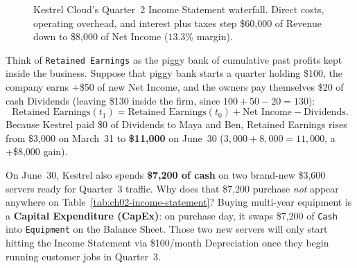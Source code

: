 \begin{figure}[htbp]
\caption{Kestrel Cloud's Quarter~2 Income Statement waterfall. Direct costs, operating overhead, and interest plus taxes step \$60,000 of Revenue down to \$8,000 of Net Income ($13.3\%$ margin).}
\label{ch02:fig-pl-staircase}
\end{figure}

Think of \texttt{Retained Earnings} as the piggy bank of cumulative past profits kept inside the business. Suppose that piggy bank starts a quarter holding \$100, the company earns +\$50 of new Net Income, and the owners pay themselves \$20 of cash Dividends (leaving \$130 inside the firm, since $100 + 50 - 20 = 130$):
\begin{equation}
  \label{eq:retained-earnings-law}
  \text{Retained Earnings}(t_1) = \text{Retained Earnings}(t_0) + \text{Net Income} - \text{Dividends}.
\end{equation}
Because Kestrel paid \$0 of Dividends to Maya and Ben, Retained Earnings rises from \$3,000 on March~31 to \textbf{\$11,000} on June~30 ($3{,}000 + 8{,}000 = 11{,}000$, a +\$8,000 gain).

\begin{happeningbox}
On June~30, Kestrel also spends \textbf{\$7,200 of cash} on two brand-new \$3,600 servers ready for Quarter~3 traffic. Why does that \$7,200 purchase \emph{not} appear anywhere on Table~\ref{tab:ch02-income-statement}? Buying multi-year equipment is a \textbf{Capital Expenditure (CapEx)}: on purchase day, it swaps \$7,200 of \texttt{Cash} into \texttt{Equipment} on the Balance Sheet. Those two new servers will only start hitting the Income Statement via \$100/month Depreciation once they begin running customer jobs in Quarter~3.
\end{happeningbox}

